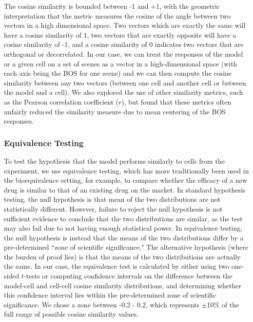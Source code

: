 The cosine similarity is bounded between -1 and +1, with the geometric interpretation that the metric measures the cosine of the angle between two vectors in a high dimensional space. Two vectors which are exactly the same will have a cosine similarity of 1, two vectors that are exactly opposite will have a cosine similarity of -1, and a cosine similarity of 0 indicates two vectors that are orthogonal or decorrelated. In our case, we can treat the responses of the model or a given cell on a set of scenes as a vector in a high-dimensional space (with each axis being the BOS for one scene) and we can then compute the cosine similarity between any two vectors (\eg between one cell and another cell or between the model and a cell). We also explored the use of other similarity metrics, such as the Pearson correlation coefficient ($r$), but found that these metrics often unfairly reduced the similarity measure due to mean centering of the BOS responses.

\subsubsection{Equivalence Testing}
To test the hypothesis that the model performs similarly to cells from the experiment, we use equivalence testing, which has more traditionally been used in the bioequivalence setting, for example, to compare whether the efficacy of a new drug is similar to that of an existing drug on the market. In standard hypothesis testing, the null hypothesis is that mean of the two distributions are not statistically different. However, failure to reject the null hypothesis is not sufficient evidence to conclude that the two distributions are similar, as the test may also fail due to not having enough statistical power. In equivalence testing, the null hypothesis is instead that the means of the two distributions differ by a pre-determined ``zone of scientific significance." The alternative hypothesis (where the burden of proof lies) is that the means of the two distributions are actually the same. In our case, the equivalence test is calculated by either using two one-sided $t$-tests or computing confidence intervals on the difference between the model-cell and cell-cell cosine similarity distributions, and determining whether this confidence interval lies within the pre-determined zone of scientific significance. We chose a zone between -0.2 - 0.2, which represents $\pm$10\% of the full range of possible cosine similarity values.

